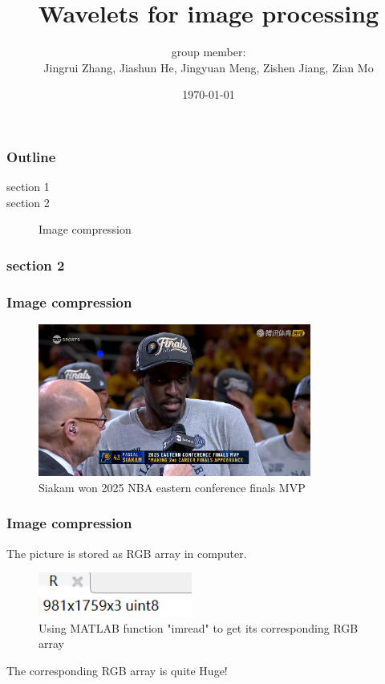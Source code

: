 \documentclass{beamer} %
\begin{document}
\title{Wavelets for image processing}
\author{group member: \\Jingrui Zhang, Jiashun He, Jingyuan Meng, Zishen Jiang, Zian Mo}
\date{\today}
\frame{\titlepage}

\begin{frame}
	\frametitle{Outline}
	\LARGE

	\begin{description}
		\item[section 1]
		\item[section 2] Image compression
	\end{description}
\end{frame}

\begin{frame}
	\frametitle{section 2}
\end{frame}

\begin{frame}
	\frametitle{Image compression}
	\begin{figure}
		\centering
		\includegraphics[width=0.8\textwidth]{fig/Siakam.png} %
		\caption{Siakam won 2025 NBA eastern conference finals MVP}
		\label{fig:Siakam}
	\end{figure}
\end{frame}

\begin{frame}
	\frametitle{Image compression}
	The picture is stored as RGB array in computer.
	\begin{figure}
		\centering
		\includegraphics[width=0.45\textwidth]{fig/pic_Siakam_RGB_size.png} %
		\caption{Using MATLAB function "imread" to get its corresponding RGB array}
		\label{fig:Siakam_size}
	\end{figure}
	{\color{red}The corresponding RGB array is quite Huge!}
\end{frame}
\end{document}
